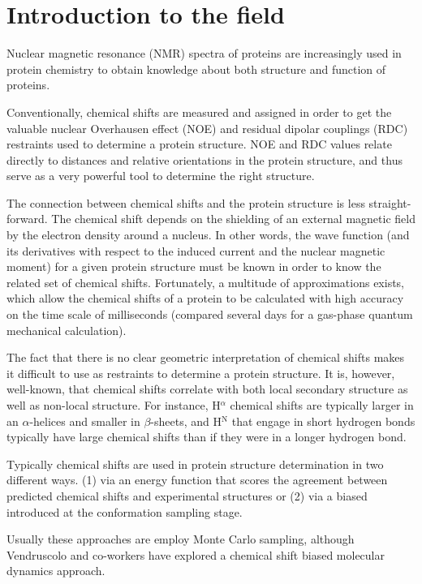 
\chapter{Introduction to the field}

Nuclear magnetic resonance (NMR) spectra of proteins are increasingly used in protein chemistry to obtain knowledge about both structure and function of proteins.

Conventionally, chemical shifts are measured and assigned in order to get the valuable nuclear Overhausen effect (NOE) and residual dipolar couplings (RDC) restraints used to determine a protein structure. NOE and RDC values relate directly to distances and relative orientations in the protein structure, and thus serve as a very powerful tool to determine the right structure.

The connection between chemical shifts and the protein structure is less straight-forward.
The chemical shift depends on the shielding of an external magnetic field by the electron density around a nucleus.
In other words, the wave function (and its derivatives with respect to the induced current and the nuclear magnetic moment) for a given protein structure must be known in order to know the related set of chemical shifts.
Fortunately, a multitude of approximations exists, which allow the chemical shifts of a protein to be calculated with high accuracy on the time scale of milliseconds (compared several days for a gas-phase quantum mechanical calculation).

The fact that there is no clear geometric interpretation of chemical shifts makes it difficult to use as restraints to determine a protein structure.
It is, however, well-known, that chemical shifts correlate with both local secondary structure as well as non-local structure. For instance, H$^\alpha$ chemical shifts are typically larger in an $\alpha$-helices and smaller in $\beta$-sheets, and H$^\mathrm{N}$ that engage in short hydrogen bonds typically have large chemical shifts than if they were in a longer hydrogen bond.

Typically chemical shifts are used in protein structure determination in two different ways.
(1) via an energy function that scores the agreement between predicted chemical shifts and experimental structures or (2) via a biased introduced at the conformation sampling stage.

Usually these approaches are employ Monte Carlo sampling, although Vendruscolo and co-workers have explored a chemical shift biased molecular dynamics approach.


